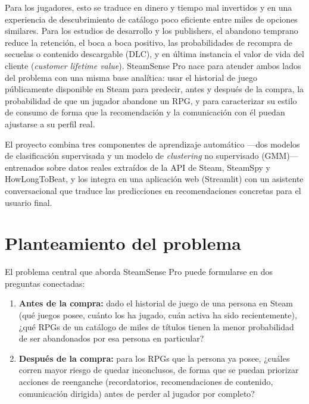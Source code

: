 \documentclass[11pt,letterpaper]{article}
\begin{document}
Para los jugadores, esto se traduce en dinero y tiempo mal invertidos y en una experiencia de descubrimiento de catálogo poco eficiente entre miles de opciones similares. Para los estudios de desarrollo y los publishers, el abandono temprano reduce la retención, el boca a boca positivo, las probabilidades de recompra de secuelas o contenido descargable (DLC), y en última instancia el valor de vida del cliente (\textit{customer lifetime value}). SteamSense Pro nace para atender ambos lados del problema con una misma base analítica: usar el historial de juego públicamente disponible en Steam para predecir, antes y después de la compra, la probabilidad de que un jugador abandone un RPG, y para caracterizar su estilo de consumo de forma que la recomendación y la comunicación con él puedan ajustarse a su perfil real.

El proyecto combina tres componentes de aprendizaje automático ---dos modelos de clasificación supervisada y un modelo de \textit{clustering} no supervisado (GMM)--- entrenados sobre datos reales extraídos de la API de Steam, SteamSpy y HowLongToBeat, y los integra en una aplicación web (Streamlit) con un asistente conversacional que traduce las predicciones en recomendaciones concretas para el usuario final.

\section{Planteamiento del problema}

El problema central que aborda SteamSense Pro puede formularse en dos preguntas conectadas:

\begin{enumerate}[label=(\roman*)]
  \item \textbf{Antes de la compra:} dado el historial de juego de una persona en Steam (qué juegos posee, cuánto los ha jugado, cuán activa ha sido recientemente), ¿qué RPGs de un catálogo de miles de títulos tienen la menor probabilidad de ser abandonados por esa persona en particular?
  \item \textbf{Después de la compra:} para los RPGs que la persona ya posee, ¿cuáles corren mayor riesgo de quedar inconclusos, de forma que se puedan priorizar acciones de reenganche (recordatorios, recomendaciones de contenido, comunicación dirigida) antes de perder al jugador por completo?
\end{enumerate}
\end{document}
